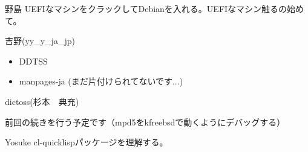 \begin{prework}{ 野島 }
UEFIなマシンをクラックしてDebianを入れる。UEFIなマシン触るの始めて。
\end{prework}

\begin{prework}{ 吉野(yy\_{}y\_{}ja\_{}jp) }
\begin{itemize}
\item DDTSS
\item manpages-ja (まだ片付けられてないです...)
\end{itemize}
\end{prework}

\begin{prework}{ dictoss(杉本　典充) }

前回の続きを行う予定です（mpd5をkfreebsdで動くようにデバッグする）

\end{prework}

\begin{prework}{ Yosuke }
cl-quicklispパッケージを理解する。
\end{prework}
